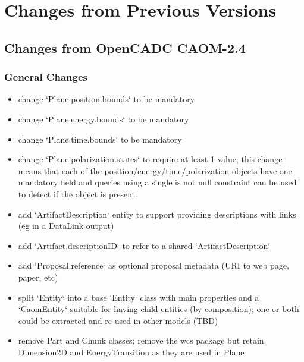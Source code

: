 \documentclass[11pt,a4paper]{ivoa}
\begin{document}




\appendix
\section{Changes from Previous Versions}

\subsection{Changes from OpenCADC CAOM-2.4}

\subsubsection{General Changes}
\begin{itemize}
\item change `Plane.position.bounds` to be mandatory

\item change `Plane.energy.bounds` to be mandatory

\item change `Plane.time.bounds` to be mandatory

\item change `Plane.polarization.states` to require at least 1 value; this change
means that each of the position/energy/time/polarization objects 
have one mandatory field and queries using a single is not null constraint
can be used to detect if the object is present.

\item add `ArtifactDescription` entity to support providing descriptions with links 
(eg in a DataLink output)

\item add `Artifact.descriptionID` to refer to a shared `ArtifactDescription`

\item add `Proposal.reference` as optional proposal metadata (URI to web page, paper, etc)

\item split `Entity` into a base `Entity` class with main properties and a `CaomEntity` 
suitable for having child entities (by composition); one or both could be extracted 
and re-used in other models (TBD)

\item remove Part and Chunk classes; remove the wcs package but retain Dimension2D and 
EnergyTransition as they are used in Plane
\end{itemize}
\end{document}
